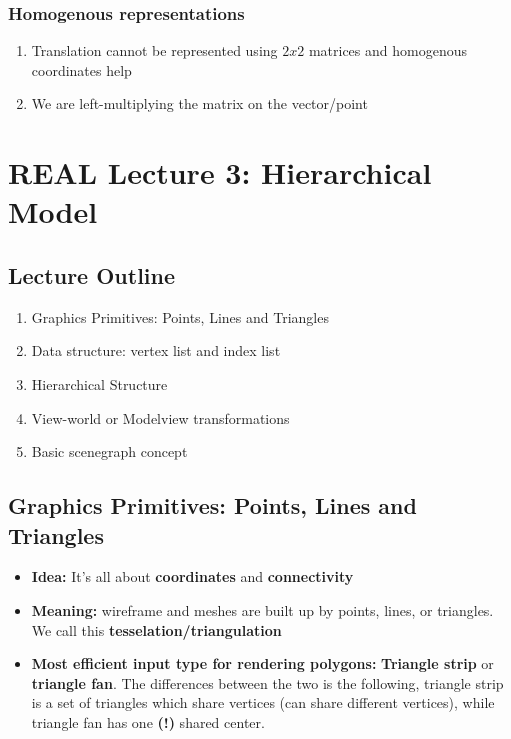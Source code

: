 \documentclass[11pt]{article}
\begin{document}

\subsubsection{Homogenous representations}
\begin{enumerate}
    \item Translation cannot be represented using $2 x 2$  matrices and homogenous coordinates help
    \item We are left-multiplying the matrix on the vector/point 
\end{enumerate}



\section{REAL Lecture 3: Hierarchical Model}
\subsection*{Lecture Outline}
\begin{enumerate}
    \item Graphics Primitives: Points, Lines and Triangles
    \item Data structure: vertex list and index list
    \item Hierarchical Structure
    \item View-world or Modelview transformations
    \item Basic scenegraph concept
\end{enumerate}

\subsection{Graphics Primitives: Points, Lines and Triangles}

\begin{itemize}
    \item \textbf{Idea:} It's all about \textbf{coordinates} and \textbf{connectivity}
    \item \textbf{Meaning:} wireframe and meshes are built up by points, lines, or triangles. We call this \textbf{tesselation/triangulation}
    \item \textbf{Most efficient input type for rendering polygons:}  \textbf{Triangle strip} or \textbf{triangle fan}. The differences between the two is the following, triangle strip is a set of triangles which share vertices (can share different vertices), while triangle fan has one \textbf{(!)} shared center. 
\end{itemize}
\end{document}
